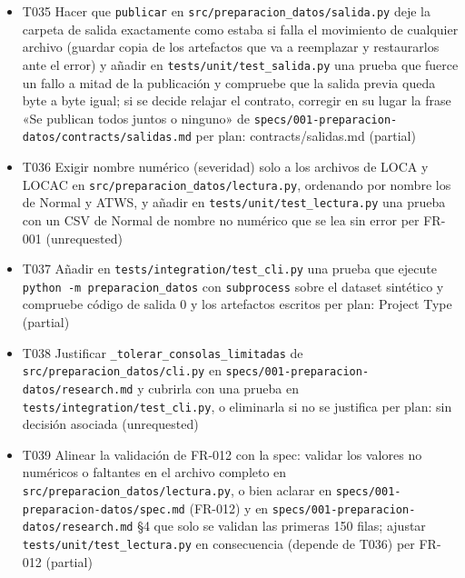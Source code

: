 \documentclass[12pt,a4paper]{article}
\providecommand{\tightlist}{\setlength{\itemsep}{0pt}\setlength{\parskip}{0pt}}
\newenvironment{documentogenerado}[2]{%
  \def\doccomando{#1}\def\docruta{#2}%
  \par\begingroup\small\setstretch{1.15}\sloppy%
}{\endgroup\par\medskip}
\begin{document}
\begin{documentogenerado}{/speckit-tasks (fase 7: /speckit-converge)}{specs\slash 001-preparacion-datos\slash tasks.md}
\begin{itemize}
\tightlist
\item[$\boxtimes$]
  T035 Hacer que \texttt{publicar} en \texttt{src/\allowbreak{}preparacion\_\allowbreak{}datos/\allowbreak{}salida.\allowbreak{}py} deje la carpeta de salida exactamente como estaba si falla el movimiento de cualquier archivo (guardar copia de los artefactos que va a reemplazar y restaurarlos ante el error) y añadir en \texttt{tests/\allowbreak{}unit/\allowbreak{}test\_\allowbreak{}salida.\allowbreak{}py} una prueba que fuerce un fallo a mitad de la publicación y compruebe que la salida previa queda byte a byte igual; si se decide relajar el contrato, corregir en su lugar la frase «Se publican todos juntos o ninguno» de \texttt{specs/\allowbreak{}001-\allowbreak{}preparacion-\allowbreak{}datos/\allowbreak{}contracts/\allowbreak{}salidas.\allowbreak{}md} per plan: contracts/\hspace{0pt}salidas.md (partial)
\item[$\boxtimes$]
  T036 Exigir nombre numérico (severidad) solo a los archivos de LOCA y LOCAC en \texttt{src/\allowbreak{}preparacion\_\allowbreak{}datos/\allowbreak{}lectura.\allowbreak{}py}, ordenando por nombre los de Normal y ATWS, y añadir en \texttt{tests/\allowbreak{}unit/\allowbreak{}test\_\allowbreak{}lectura.\allowbreak{}py} una prueba con un CSV de Normal de nombre no numérico que se lea sin error per FR-001 (unrequested)
\item[$\boxtimes$]
  T037 Añadir en \texttt{tests/\allowbreak{}integration/\allowbreak{}test\_\allowbreak{}cli.\allowbreak{}py} una prueba que ejecute \texttt{python\ -\allowbreak{}m\ preparacion\_\allowbreak{}datos} con \texttt{subprocess} sobre el dataset sintético y compruebe código de salida 0 y los artefactos escritos per plan: Project Type (partial)
\item[$\boxtimes$]
  T038 Justificar \texttt{\_\allowbreak{}tolerar\_\allowbreak{}consolas\_\allowbreak{}limitadas} de \texttt{src/\allowbreak{}preparacion\_\allowbreak{}datos/\allowbreak{}cli.\allowbreak{}py} en \texttt{specs/\allowbreak{}001-\allowbreak{}preparacion-\allowbreak{}datos/\allowbreak{}research.\allowbreak{}md} y cubrirla con una prueba en \texttt{tests/\allowbreak{}integration/\allowbreak{}test\_\allowbreak{}cli.\allowbreak{}py}, o eliminarla si no se justifica per plan: sin decisión asociada (unrequested)
\item[$\boxtimes$]
  T039 Alinear la validación de FR-012 con la spec: validar los valores no numéricos o faltantes en el archivo completo en \texttt{src/\allowbreak{}preparacion\_\allowbreak{}datos/\allowbreak{}lectura.\allowbreak{}py}, o bien aclarar en \texttt{specs/\allowbreak{}001-\allowbreak{}preparacion-\allowbreak{}datos/\allowbreak{}spec.\allowbreak{}md} (FR-012) y en \texttt{specs/\allowbreak{}001-\allowbreak{}preparacion-\allowbreak{}datos/\allowbreak{}research.\allowbreak{}md} §4 que solo se validan las primeras 150 filas; ajustar \texttt{tests/\allowbreak{}unit/\allowbreak{}test\_\allowbreak{}lectura.\allowbreak{}py} en consecuencia (depende de T036) per FR-012 (partial)

\end{itemize}
\end{documentogenerado}
\end{document}
